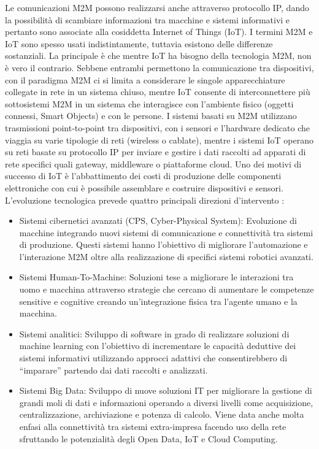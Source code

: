 \documentclass[12pt,a4paper,openright,twoside]{report}
\begin{document}
Le comunicazioni M2M possono realizzarsi anche attraverso protocollo IP, dando la possibilit\`a di scambiare informazioni tra macchine e sistemi informativi e pertanto sono associate alla cosiddetta Internet of Things (IoT).
I termini M2M e IoT sono spesso usati indistintamente, tuttavia esistono delle differenze sostanziali. La principale \`e che mentre IoT ha bisogno della tecnologia M2M, non \`e vero il contrario. Sebbene entrambi permettono la comunicazione tra dispositivi, con il paradigma M2M ci si limita a considerare le singole apparecchiature collegate in rete in un sistema chiuso, mentre IoT consente di interconnettere pi\`u sottosistemi M2M in un sistema che interagisce con l'ambiente fisico (oggetti connessi, Smart Objects) e con le persone.
I sistemi basati su M2M utilizzano trasmissioni point-to-point tra dispositivi, con i sensori e l'hardware dedicato che viaggia su varie tipologie di reti (wireless o cablate), mentre i sistemi IoT operano su reti basate su protocollo IP per inviare e gestire i dati raccolti ad apparati di rete specifici quali gateway, middleware o piattaforme cloud.
Uno dei motivi di successo di IoT \`e l'abbattimento dei costi di produzione delle componenti elettroniche con cui \`e possibile assemblare e costruire dispositivi e sensori. L'evoluzione tecnologica prevede quattro principali direzioni d'intervento \cite{K27} :
\begin{itemize}                       
\item Sistemi cibernetici avanzati (CPS, Cyber-Physical System): Evoluzione di macchine integrando nuovi sistemi di comunicazione e connettivit\`a tra sistemi di produzione. Questi sistemi hanno l'obiettivo di migliorare l'automazione e l'interazione M2M oltre alla realizzazione di specifici sistemi robotici avanzati.
\item Sistemi Human-To-Machine: Soluzioni tese a migliorare le interazioni tra uomo e macchina attraverso strategie che cercano di aumentare le competenze sensitive e cognitive creando un'integrazione fisica tra l'agente umano e la macchina.
\item Sistemi analitici: Sviluppo di software in grado di realizzare soluzioni di machine learning con l'obiettivo di incrementare le capacit\`a deduttive dei sistemi informativi utilizzando approcci adattivi che consentirebbero di ``imparare'' partendo dai dati raccolti e analizzati.
\item Sistemi Big Data: Sviluppo di nuove soluzioni IT per migliorare la gestione di grandi moli di dati e informazioni operando a diversi livelli come acquisizione, centralizzazione, archiviazione e potenza di calcolo. Viene data anche molta enfasi alla connettivit\`a tra sistemi extra-impresa facendo uso della rete sfruttando le potenzialit\`a degli Open Data, IoT e Cloud Computing.
\end{itemize}
\end{document}
